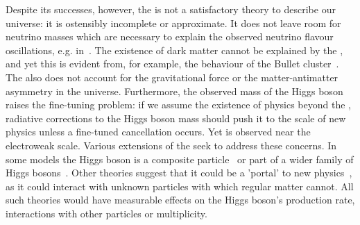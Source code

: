 Despite its successes, however, the \SM is not a satisfactory theory to describe our universe: it is ostensibly incomplete or approximate. It does not leave room for neutrino masses which are necessary to explain the observed neutrino flavour oscillations, e.g. in~\cite{DayaBay}. The existence of dark matter cannot be explained by the \SM, and yet this is evident from, for example, the behaviour of the Bullet cluster~\cite{1538-4357-648-2-L109}. The \SM also does not account for the gravitational force or the matter-antimatter asymmetry in the universe. Furthermore, the observed mass of the Higgs boson raises the fine-tuning problem: if we assume the existence of physics beyond the \SM, radiative corrections to the Higgs boson mass should push it to the scale of new physics unless a fine-tuned cancellation occurs. Yet \mH is observed near the electroweak scale. Various extensions of the \SM seek to address these concerns. In some models the Higgs boson is a composite particle~\cite{Agashe:2004rs} or part of a wider family of Higgs bosons~\cite{Craig:2013hca}. Other theories suggest that it could be a 'portal' to new physics~\cite{Patt:2006fw}, as it could interact with unknown particles with which regular matter cannot. All such theories would have measurable effects on the Higgs boson's production rate, interactions with other particles or multiplicity. 

